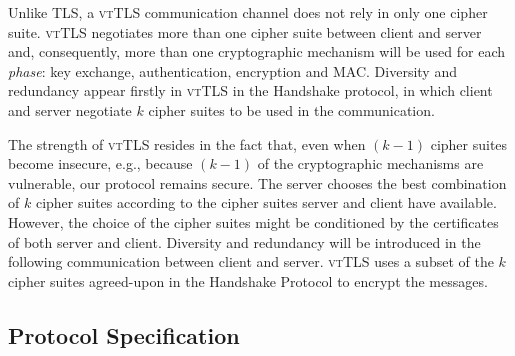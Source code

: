 \documentclass{sig-alternate-05-2015}
\begin{document}
Unlike TLS, a \textsc{vtTLS} communication channel does not rely in only one cipher suite. \textsc{vtTLS} negotiates more than one cipher suite between client and server and, consequently, more than one cryptographic mechanism will be used for each \emph{phase}: key exchange, authentication, encryption and MAC.
%
Diversity and redundancy appear firstly in \textsc{vtTLS} in the Handshake protocol, in which client and server negotiate $k$ cipher suites to be used in the communication.

The strength of \textsc{vtTLS} resides in the fact that, even when $(k - 1)$ cipher suites become insecure, e.g., because $(k-1)$ of the  cryptographic mechanisms are vulnerable, our protocol remains secure. %
The server chooses the best combination of $k$ cipher suites according to the cipher suites server and client have available. However, the choice of the cipher suites might be conditioned by the certificates of both server and client.
Diversity and redundancy will  be introduced in the following communication between client and server. \textsc{vtTLS} uses a subset of the $k$ cipher suites agreed-upon in the Handshake Protocol to encrypt the messages.




\subsection{Protocol Specification}
\end{document}
